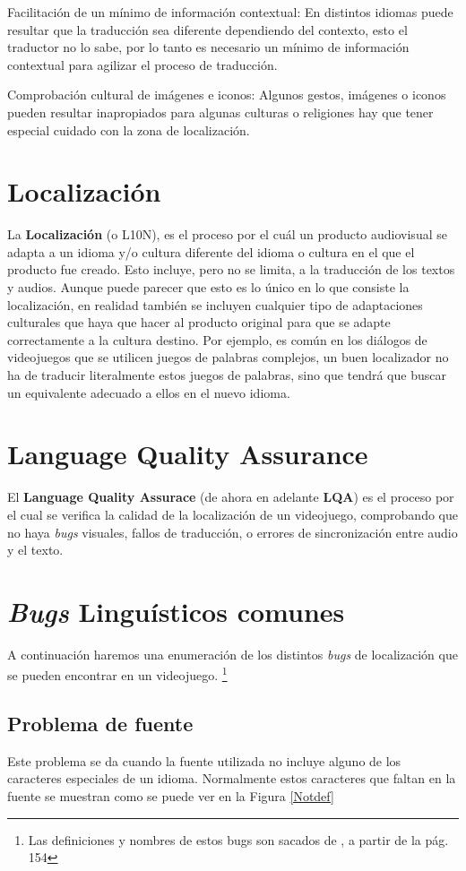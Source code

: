 Facilitación de un mínimo de información contextual: En distintos idiomas puede resultar que la traducción sea diferente dependiendo del contexto, esto el traductor no lo sabe, por lo tanto es necesario un mínimo de información contextual para agilizar el proceso de traducción.

Comprobación cultural de imágenes e iconos: Algunos gestos, imágenes o iconos pueden resultar inapropiados para algunas culturas o religiones hay que tener especial cuidado con la zona de localización.

\section{Localización}

La \textbf{Localización} (o L10N), es el proceso por el cuál un producto audiovisual se adapta a un idioma y/o cultura diferente del idioma o cultura en el que el producto fue creado. Esto incluye, pero no se limita, a la traducción de los textos y audios. Aunque puede parecer que esto es lo único en lo que consiste la localización, en realidad también se incluyen cualquier tipo de adaptaciones culturales que haya que hacer al producto original para que se adapte correctamente a la cultura destino. Por ejemplo, es común en los diálogos de videojuegos que se utilicen juegos de palabras complejos, un buen localizador no ha de traducir literalmente estos juegos de palabras, sino que tendrá que buscar un equivalente adecuado a ellos en el nuevo idioma.


\section{Language Quality Assurance}

El \textbf{Language Quality Assurace} (de ahora en adelante \textbf{LQA}) es el proceso por el cual se verifica la calidad de la localización de un videojuego, comprobando que no haya \textit{bugs} visuales, fallos de traducción, o errores de sincronización entre audio y el texto.
\section{\textit{Bugs} Linguísticos comunes} \label{bugs}
A continuación haremos una enumeración de los distintos \textit{bugs} de localización que se pueden encontrar en un videojuego. \footnote{Las definiciones y nombres de estos bugs son sacados de \citet{LQAPSM2017}, a partir de la pág. 154}
\subsection{Problema de fuente} \label{ErrorFuente}
Este problema se da cuando la fuente utilizada no incluye alguno de los caracteres especiales de un idioma. Normalmente estos caracteres que faltan en la fuente se muestran como se puede ver en la Figura \ref{Notdef}

